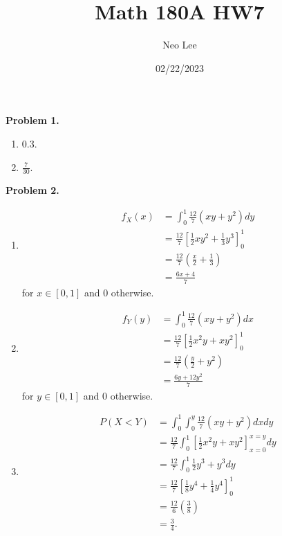 \documentclass{article}
\title{Math 180A HW7}
\author{Neo Lee}
\date{02/22/2023}
\begin{document}
 

\maketitle 

\textbf{Problem 1.}
\begin{enumerate}[label={(\alph*)}]
    \item 0.3.
    \item $\frac{7}{30}$.
\end{enumerate}
\bigbreak

\textbf{Problem 2.}
\begin{enumerate}[label={(\alph*)}]
    \item 
    \begin{align}
        f_X(x) & = \int_{0}^{1} \frac{12}{7}(xy+y^2)dy \\
        & = \frac{12}{7}\left[\frac{1}{2}xy^2+\frac{1}{3}y^3\right]_0^1 \\
        & = \frac{12}{7}\left(\frac{x}{2}+\frac{1}{3}\right) \\
        & = \frac{6x+4}{7}
    \end{align}
    for $x \in [0,1]$ and 0 otherwise.

    \item 
    \begin{align}
        f_Y(y) & = \int_{0}^{1} \frac{12}{7}(xy+y^2)dx \\
        & = \frac{12}{7}\left[\frac{1}{2}x^2y+xy^2\right]_0^1 \\
        & = \frac{12}{7}\left(\frac{y}{2}+y^2\right) \\
        & = \frac{6y + 12y^2}{7}
    \end{align}
    for $y \in [0,1]$ and 0 otherwise.

    \item 
    \begin{align}
        P(X<Y) & = \int_{0}^{1}\int_{0}^{y} \frac{12}{7}(xy+y^2)dxdy \\
        & = \frac{12}{7}\int_{0}^{1}\left[\frac{1}{2}x^2y+xy^2\right]_{x=0}^{x=y} dy \\
        & = \frac{12}{7}\int_{0}^{1} \frac{1}{2}y^3+y^3dy \\
        & = \frac{12}{7}\left[\frac{1}{8}y^4+\frac{1}{4}y^4\right]_0^1 \\
        & = \frac{12}{6}\left(\frac{3}{8}\right) \\
        & = \frac{3}{4}.
    \end{align}
\end{enumerate}
\bigbreak
\end{document}
